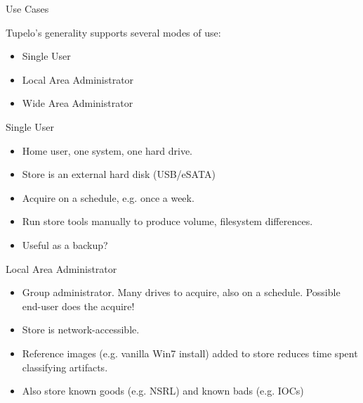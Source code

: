 \documentclass{beamer}
\begin{document}
\begin{frame}{Use Cases}

Tupelo's generality supports several modes of use:

\begin{itemize}
\item 
Single User

\item
Local Area Administrator

\item
Wide Area Administrator 

\end{itemize}

\end{frame}



\begin{frame}{Single User}

\begin{itemize}
\item Home user, one system, one hard drive.

\item Store is an external hard disk (USB/eSATA)

\item Acquire on a schedule, e.g. once a week.

\item Run store tools manually to produce volume, filesystem
  differences.

\item Useful as a backup?

\end{itemize}

\end{frame}


\begin{frame}{Local Area Administrator}

\begin{itemize}
\item Group administrator.  Many drives to acquire, also on a
  schedule.  Possible end-user does the acquire!

\item Store is network-accessible.

\item Reference images (e.g. vanilla Win7 install) added to
  store reduces time spent classifying artifacts.  

\item
Also store known goods (e.g. NSRL) and known bads (e.g. IOCs)

\end{itemize}
\end{frame}
\end{document}

